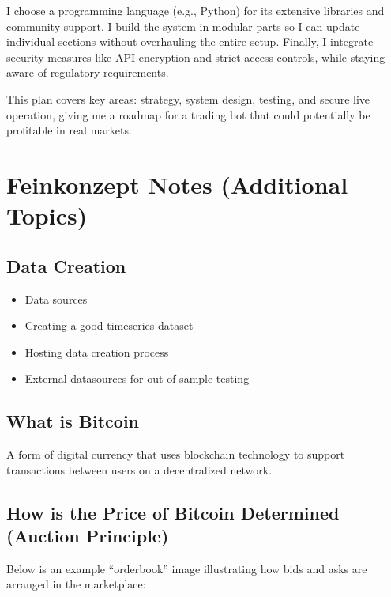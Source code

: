 \documentclass[9pt,a4paper,twocolumn,twoside]{tau-class/tau}
\begin{document}
I choose a programming language (e.g., Python) for its extensive libraries 
and community support. I build the system in modular parts so I can update 
individual sections without overhauling the entire setup. Finally, I 
integrate security measures like API encryption and strict access 
controls, while staying aware of regulatory requirements.

\noindent
This plan covers key areas: strategy, system design, testing, and secure 
live operation, giving me a roadmap for a trading bot that could potentially 
be profitable in real markets.

\section{Feinkonzept Notes (Additional Topics)}

\subsection{Data Creation}
\begin{itemize}
  \item Data sources
  \item Creating a good timeseries dataset
  \item Hosting data creation process
  \item External datasources for out-of-sample testing
\end{itemize}

\subsection{What is Bitcoin}
A form of digital currency that uses blockchain technology to support transactions between users on a decentralized network.

\subsection{How is the Price of Bitcoin Determined (Auction Principle)}

Below is an example “orderbook” image illustrating how bids and asks are 
arranged in the marketplace:
\end{document}
